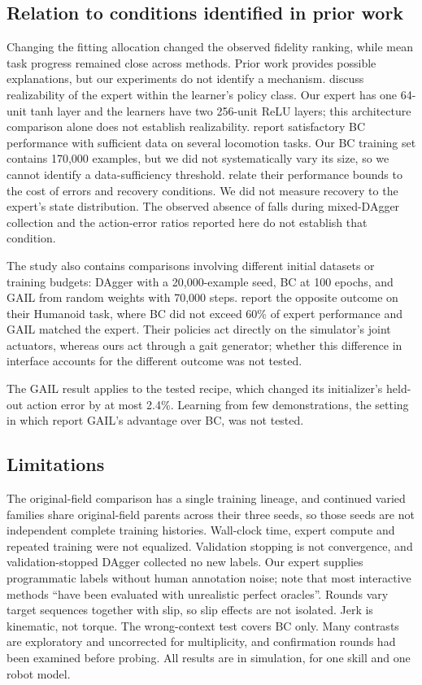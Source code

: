 \documentclass[conference]{IEEEtran}
\begin{document}
\subsection{Relation to conditions identified in prior work}
Changing the fitting allocation changed the observed fidelity ranking, while mean task progress remained close across methods. Prior work provides possible explanations, but our experiments do not identify a mechanism. \citet{spencer2021} discuss realizability of the expert within the learner's policy class. Our expert has one 64-unit tanh layer and the learners have two 256-unit ReLU layers; this architecture comparison alone does not establish realizability. \citet{ho2016} report satisfactory BC performance with sufficient data on several locomotion tasks. Our BC training set contains 170,000 examples, but we did not systematically vary its size, so we cannot identify a data-sufficiency threshold. \citet{ross2011} relate their performance bounds to the cost of errors and recovery conditions. We did not measure recovery to the expert's state distribution. The observed absence of falls during mixed-DAgger collection and the action-error ratios reported here do not establish that condition.

The study also contains comparisons involving different initial datasets or training budgets: DAgger with a 20,000-example seed, BC at 100 epochs, and GAIL from random weights with 70,000 steps. \citet{ho2016} report the opposite outcome on their Humanoid task, where BC did not exceed 60\% of expert performance and GAIL matched the expert. Their policies act directly on the simulator's joint actuators, whereas ours act through a gait generator; whether this difference in interface accounts for the different outcome was not tested.

The GAIL result applies to the tested recipe, which changed its initializer's held-out action error by at most 2.4\%. Learning from few demonstrations, the setting in which \citet{ho2016} report GAIL's advantage over BC, was not tested.

\subsection{Limitations}
The original-field comparison has a single training lineage, and continued varied families share original-field parents across their three seeds, so those seeds are not independent complete training histories. Wall-clock time, expert compute and repeated training were not equalized. Validation stopping is not convergence, and validation-stopped DAgger collected no new labels. Our expert supplies programmatic labels without human annotation noise; \citet{celemin2022} note that most interactive methods ``have been evaluated with unrealistic perfect oracles''. Rounds vary target sequences together with slip, so slip effects are not isolated. Jerk is kinematic, not torque. The wrong-context test covers BC only. Many contrasts are exploratory and uncorrected for multiplicity, and confirmation rounds had been examined before probing. All results are in simulation, for one skill and one robot model.
\end{document}
